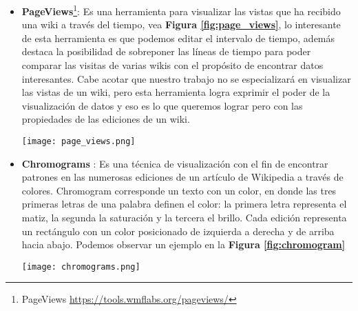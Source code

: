 \begin{itemize}
\item\textbf{PageViews}\footnote{PageViews \url{https://tools.wmflabs.org/pageviews/}}:
Es una herramienta para visualizar las vistas que ha recibido una wiki a través del tiempo, vea \textbf{Figura \ref{fig:page_views}}, lo interesante de esta herramienta es que podemos editar el intervalo de tiempo, además destaca la posibilidad de sobreponer las líneas de tiempo para poder comparar las visitas de varias wikis con el propósito de encontrar datos interesantes. Cabe acotar que nuestro trabajo no se especializará en visualizar las vistas de un wiki, pero esta herramienta logra exprimir el poder de la visualización de datos y eso es lo que queremos lograr pero con las propiedades de las ediciones de un wiki.
\bigbreak
\begin{center}
\texttt{[image: page\_views.png]}
\label{fig:page_views}
\end{center}
\bigbreak
\item\textbf{Chromograms} \cite{Chromogram}:
Es una técnica de visualización con el fin de encontrar patrones en las numerosas ediciones de un artículo de Wikipedia a través de colores. Chromogram corresponde un texto con un color, en donde las tres primeras letras de una palabra definen el color: la primera letra representa el matiz, la segunda la saturación y la tercera el brillo. Cada edición representa un rectángulo con un color posicionado de izquierda a derecha y de arriba hacia abajo. Podemos observar un ejemplo en la \textbf{Figura \ref{fig:chromogram}}
\bigbreak
\begin{center}
\texttt{[image: chromograms.png]}
\label{fig:chromogram}
\end{center}
\bigbreak


\end{itemize}
